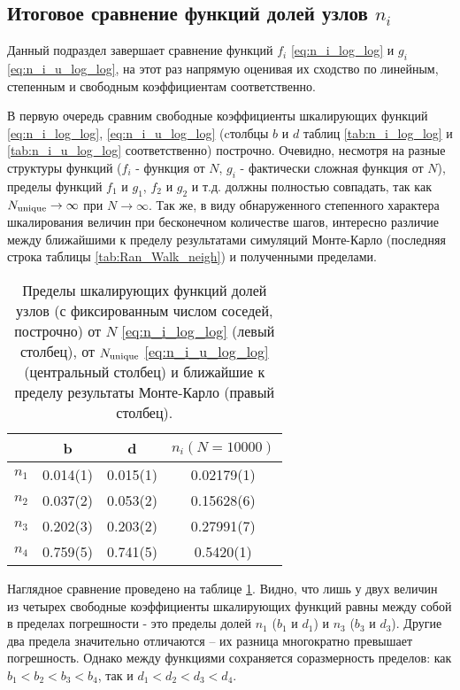 \subsection{Итоговое сравнение функций долей узлов $n_i$}

Данный подраздел завершает сравнение функций $f_i$ \eqref{eq:n_i_log_log} и $g_i$ \eqref{eq:n_i_u_log_log}, на этот раз напрямую оценивая их сходство по линейным, степенным и свободным коэффициентам соответственно.

В первую очередь сравним свободные коэффициенты шкалирующих функций \eqref{eq:n_i_log_log}, \eqref{eq:n_i_u_log_log} (cтолбцы $b$ и $d$ таблиц \ref{tab:n_i_log_log} и \ref{tab:n_i_u_log_log} соответственно) построчно. Очевидно, несмотря на разные структуры функций ($f_i$ - функция от $N$, $g_i$ - фактически сложная функция от $N$), пределы функций $f_1$ и $g_1$, $f_2$ и $g_2$ и т.д. должны полностью совпадать, так как $N_{\textup{unique}} \to \infty$ при $N \to \infty$. Так же, в виду обнаруженного степенного характера шкалирования величин при бесконечном количестве шагов, интересно различие между ближайшими к пределу результатами симуляций Монте-Карло (последняя строка таблицы \ref{tab:Ran_Walk_neigh}) и полученными пределами. 

\begin{table}[h]
\centering
\begin{tabular}{|c|c|c|c|}
\hline
 & b & d & $n_i(N=10000)$ \\ \hline
$n_1$ & 0.014(1) & 0.015(1) & 0.02179(1)\\ \hline
$n_2$ & 0.037(2) & 0.053(2) & 0.15628(6)\\ \hline
$n_3$ & 0.202(3) & 0.203(2) & 0.27991(7)\\ \hline
$n_4$ & 0.759(5) & 0.741(5) & 0.5420(1)\\ \hline
\end{tabular}
\caption{Пределы шкалирующих функций долей узлов (с фиксированным числом соседей, построчно) от $N$ \eqref{eq:n_i_log_log} (левый столбец), от $N_{\textup{unique}}$ \eqref{eq:n_i_u_log_log} (центральный столбец) и ближайшие к пределу результаты Монте-Карло (правый столбец).}
\label{tab:bd_compare}
\end{table}

Наглядное сравнение проведено на таблице \ref{tab:bd_compare}. 
Видно, что лишь у двух величин из четырех свободные коэффициенты шкалирующих функций равны между собой в пределах погрешности - это пределы долей $n_1$ ($b_1$ и $d_1$) и $n_3$ ($b_3$ и $d_3$). 
Другие два предела значительно отличаются -- их разница многократно превышает погрешность.
Однако между функциями сохраняется соразмерность пределов: как $b_1 < b_2 < b_3 < b_4$, так и $d_1 < d_2 < d_3 < d_4$.



